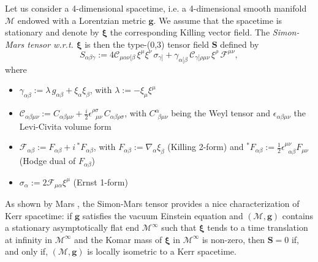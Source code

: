 \documentclass[a4paper]{jpconf}
\newcommand{\be}{\begin{equation}}
\newcommand{\ee}{\end{equation}}
\newcommand{\w}[1]{\bm{#1}}
\begin{document}
Let us consider a 4-dimensional spacetime, i.e. a 4-dimensional smooth 
manifold $\mathcal{M}$ endowed with a Lorentzian metric $\w{g}$. 
We assume that the spacetime is stationary and denote by $\w{\xi}$ 
the corresponding Killing vector field. 
The \emph{Simon-Mars tensor w.r.t. $\w{\xi}$} is then
the type-(0,3) tensor field $\w{S}$ defined by 
\be \label{e:def_Simon-Mars}
S_{\alpha\beta\gamma} := 4 \mathcal{C}_{\mu\alpha\nu[\beta} \, \xi^\mu \xi^\nu \, \sigma_{\gamma]}
 + \gamma_{\alpha[\beta} \, \mathcal{C}_{\gamma]\rho\mu\nu} \, \xi^\rho \, \mathcal{F}^{\mu\nu} ,
\ee
where
\begin{itemize}
\item $\gamma_{\alpha\beta} := \lambda \, g_{\alpha\beta} + \xi_\alpha \xi_\beta$, 
with $\lambda := - \xi_\mu \xi^\mu$
\item $\mathcal{C}_{\alpha\beta\mu\nu} := C_{\alpha\beta\mu\nu}
    + \frac{i}{2} \epsilon^{\rho\sigma}_{\ \ \, \mu\nu}\,  C_{\alpha\beta\rho\sigma} $,
with $C^\alpha_{\ \, \beta\mu\nu}$ being the Weyl tensor and 
$\epsilon_{\alpha\beta\mu\nu}$ the Levi-Civita volume form
\item $\mathcal{F}_{\alpha\beta} := F_{\alpha\beta} + i\,  {}^*\!F_{\alpha\beta}$, 
with $F_{\alpha\beta} := \nabla_\alpha\xi_\beta$ (Killing 2-form) and 
${}^*\!F_{\alpha\beta} := \frac{1}{2} \epsilon^{\mu\nu}_{\ \ \, \alpha\beta} F_{\mu\nu}$
(Hodge dual of $F_{\alpha\beta}$)
\item $\sigma_\alpha := 2 \mathcal{F}_{\mu\alpha} \xi^\mu$ (Ernst 1-form)
\end{itemize}
As shown by Mars \cite{Mars99}, the 
Simon-Mars tensor provides a nice characterization of Kerr spacetime:
if $\w{g}$ satisfies the vacuum Einstein equation and $(\mathcal{M},\w{g})$
contains a stationary asymptotically flat end $\mathcal{M}^\infty$ such
that $\w{\xi}$ tends to a time translation at infinity in $\mathcal{M}^\infty$
and the Komar mass of $\w{\xi}$ in $\mathcal{M}^\infty$ is non-zero, then 
$\w{S} = 0$ if, and only if, $(\mathcal{M},\w{g})$ is locally isometric 
to a Kerr spacetime.
\end{document}
